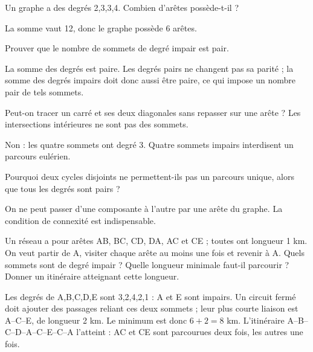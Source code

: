 \documentclass[11pt]{article}
\begin{document}
Un graphe a des degrés 2,3,3,4. Combien d’arêtes possède-t-il ?\par
La somme vaut 12, donc le graphe possède 6 arêtes.\par
{}
Prouver que le nombre de sommets de degré impair est pair.\par
La somme des degrés est paire. Les degrés pairs ne changent pas sa parité ; la somme des degrés impairs doit donc aussi être paire, ce qui impose un nombre pair de tels sommets.\par
{}
Peut-on tracer un carré et ses deux diagonales sans repasser sur une arête ? Les intersections intérieures ne sont pas des sommets.\par
Non : les quatre sommets ont degré 3. Quatre sommets impairs interdisent un parcours eulérien.\par
{}
Pourquoi deux cycles disjoints ne permettent-ils pas un parcours unique, alors que tous les degrés sont pairs ?\par
On ne peut passer d’une composante à l’autre par une arête du graphe. La condition de connexité est indispensable.\par
{}
Un réseau a pour arêtes AB, BC, CD, DA, AC et CE ; toutes ont longueur 1 km. On veut partir de A, visiter chaque arête au moins une fois et revenir à A. Quels sommets sont de degré impair ? Quelle longueur minimale faut-il parcourir ? Donner un itinéraire atteignant cette longueur.\par
Les degrés de A,B,C,D,E sont 3,2,4,2,1 : A et E sont impairs. Un circuit fermé doit ajouter des passages reliant ces deux sommets ; leur plus courte liaison est A--C--E, de longueur 2 km. Le minimum est donc \(6 + 2 = 8\) km. L’itinéraire A--B--C--D--A--C--E--C--A l’atteint : AC et CE sont parcourues deux fois, les autres une fois.\par
\end{document}
